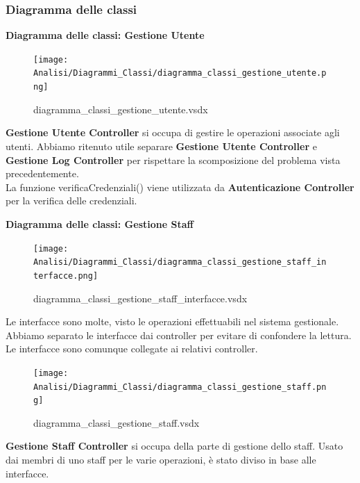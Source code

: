 \documentclass[a4paper]{article}
\begin{document}
\newpage

\subsubsection{Diagramma delle classi}


\textbf{Diagramma delle classi: Gestione Utente}


\begin{figure}[H]
    \texttt{[image: Analisi/Diagrammi\_Classi/diagramma\_classi\_gestione\_utente.png]}
    \centering
    \caption{diagramma\_classi\_gestione\_utente.vsdx}
\end{figure}

\textbf{Gestione Utente Controller} si occupa di gestire le operazioni associate agli utenti. Abbiamo ritenuto utile separare \textbf{Gestione Utente Controller} e \textbf{Gestione Log Controller} per rispettare la scomposizione del problema vista precedentemente.\\La funzione verificaCredenziali() viene utilizzata da \textbf{Autenticazione Controller} per la verifica delle credenziali.

\newpage

\textbf{Diagramma delle classi: Gestione Staff}

\begin{figure}[H]
    \texttt{[image: Analisi/Diagrammi\_Classi/diagramma\_classi\_gestione\_staff\_interfacce.png]}
    \centering
    \caption{diagramma\_classi\_gestione\_staff\_interfacce.vsdx}
\end{figure}

Le interfacce sono molte, visto le operazioni effettuabili nel sistema gestionale. Abbiamo separato le interfacce dai controller per evitare di confondere la lettura. Le interfacce sono comunque collegate ai relativi controller.

\begin{figure}[H]
    \texttt{[image: Analisi/Diagrammi\_Classi/diagramma\_classi\_gestione\_staff.png]}
    \centering
    \caption{diagramma\_classi\_gestione\_staff.vsdx}
\end{figure}

\textbf{Gestione Staff Controller} si occupa della parte di gestione dello staff. Usato dai membri di uno staff per le varie operazioni, è stato diviso in base alle interfacce. 
\end{document}
